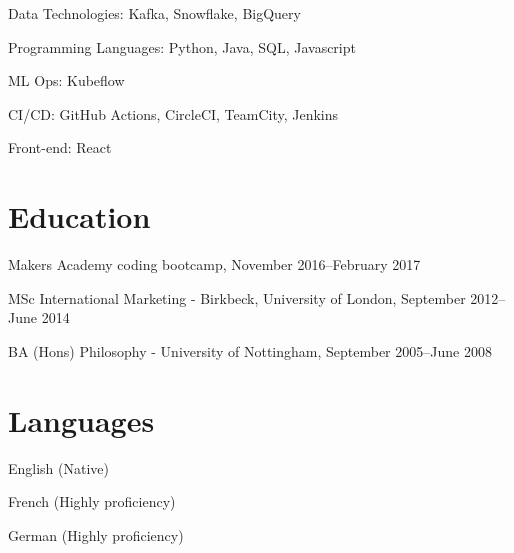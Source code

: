\documentclass[a4paper]{scrartcl}
\begin{document}
Data Technologies: Kafka, Snowflake, BigQuery

Programming Languages: Python, Java, SQL, Javascript

ML Ops: Kubeflow

CI/CD: GitHub Actions, CircleCI, TeamCity, Jenkins

Front-end: React

\section*{Education}
Makers Academy coding bootcamp, November 2016--February 2017

MSc International Marketing - Birkbeck, University of London, September 2012--June 2014

BA (Hons) Philosophy - University of Nottingham, September 2005--June 2008

\section*{Languages}
English (Native)

French (Highly proficiency)

German (Highly proficiency)
\end{document}

